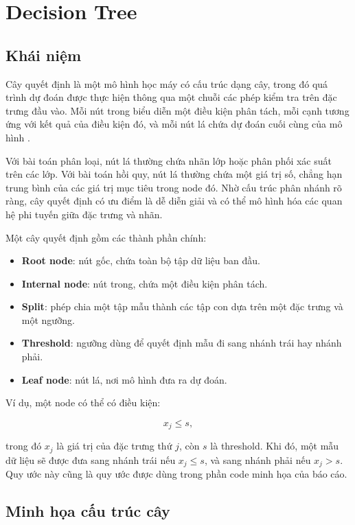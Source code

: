 \section{Decision Tree}

\subsection{Khái niệm}

Cây quyết định là một mô hình học máy có cấu trúc dạng cây, trong đó quá trình dự đoán được thực hiện thông qua một chuỗi các phép kiểm tra trên đặc trưng đầu vào. Mỗi nút trong biểu diễn một điều kiện phân tách, mỗi cạnh tương ứng với kết quả của điều kiện đó, và mỗi nút lá chứa dự đoán cuối cùng của mô hình \cite{breiman1984classification}.

Với bài toán phân loại, nút lá thường chứa nhãn lớp hoặc phân phối xác suất trên các lớp. Với bài toán hồi quy, nút lá thường chứa một giá trị số, chẳng hạn trung bình của các giá trị mục tiêu trong node đó. Nhờ cấu trúc phân nhánh rõ ràng, cây quyết định có ưu điểm là dễ diễn giải và có thể mô hình hóa các quan hệ phi tuyến giữa đặc trưng và nhãn.

Một cây quyết định gồm các thành phần chính:

\begin{itemize}
    \item \textbf{Root node}: nút gốc, chứa toàn bộ tập dữ liệu ban đầu.
    \item \textbf{Internal node}: nút trong, chứa một điều kiện phân tách.
    \item \textbf{Split}: phép chia một tập mẫu thành các tập con dựa trên một đặc trưng và một ngưỡng.
    \item \textbf{Threshold}: ngưỡng dùng để quyết định mẫu đi sang nhánh trái hay nhánh phải.
    \item \textbf{Leaf node}: nút lá, nơi mô hình đưa ra dự đoán.
\end{itemize}

Ví dụ, một node có thể có điều kiện:

\[
x_j \leq s,
\]

trong đó $x_j$ là giá trị của đặc trưng thứ $j$, còn $s$ là threshold. Khi đó, một mẫu dữ liệu sẽ được đưa sang nhánh trái nếu $x_j \leq s$, và sang nhánh phải nếu $x_j > s$. Quy ước này cũng là quy ước được dùng trong phần code minh họa của báo cáo.

\subsection{Minh họa cấu trúc cây}

